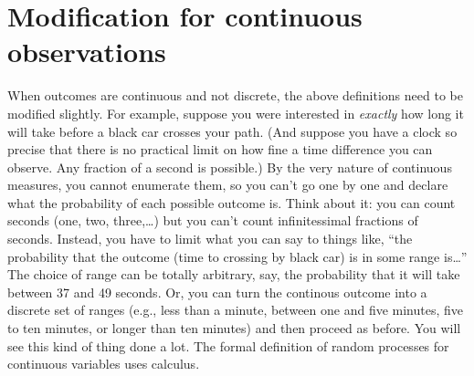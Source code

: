 \documentclass[openany]{book}
\begin{document}
\hypertarget{modification-for-continuous-observations}{%
\section{Modification for continuous observations}\label{modification-for-continuous-observations}}

When outcomes are continuous and not discrete, the above definitions need to be modified slightly. For example, suppose you were interested in \emph{exactly} how long it will take before a black car crosses your path. (And suppose you have a clock so precise that there is no practical limit on how fine a time difference you can observe. Any fraction of a second is possible.) By the very nature of continuous measures, you cannot enumerate them, so you can't go one by one and declare what the probability of each possible outcome is. Think about it: you can count seconds (one, two, three,\ldots{}) but you can't count infinitessimal fractions of seconds. Instead, you have to limit what you can say to things like, ``the probability that the outcome (time to crossing by black car) is in some range is\ldots{}'' The choice of range can be totally arbitrary, say, the probability that it will take between 37 and 49 seconds. Or, you can turn the continous outcome into a discrete set of ranges (e.g., less than a minute, between one and five minutes, five to ten minutes, or longer than ten minutes) and then proceed as before. You will see this kind of thing done a lot. The formal definition of random processes for continuous variables uses calculus.


\end{document}
